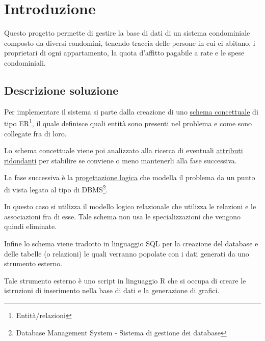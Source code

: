 \section{Introduzione}

Questo progetto permette di gestire la base di dati di
un sistema condominiale composto da diversi condomini,
tenendo traccia delle persone in cui ci abitano, i
proprietari di ogni appartamento, la quota d'affitto
pagabile a rate e le spese condominiali.

\subsection{Descrizione soluzione}

Per implementare il sistema si parte dalla creazione di uno
\hyperref[schemaER]{schema concettuale}
di tipo ER\footnote{Entità/relazioni},
il quale definisce quali entità sono presenti nel problema
e come sono collegate fra di loro.

Lo schema concettuale viene poi analizzato alla ricerca di
eventuali
\hyperref[ridondanze]{attributi ridondanti}
per stabilire se conviene o meno mantenerli alla fase successiva.

La fase successiva è la
\hyperref[logico]{progettazione logica}
che modella il problema da un punto di vista legato al tipo di
DBMS\footnote{Database Management System - Sistema di gestione dei database}.

In questo caso si utilizza il modello logico relazionale che
utilizza le relazioni e le associazioni fra di esse. Tale schema
non usa le specializzazioni che vengono quindi eliminate.


Infine lo schema viene tradotto in linguaggio SQL per la
creazione del database e delle tabelle (o relazioni) le quali
verranno popolate con i dati generati da uno strumento esterno.

Tale strumento esterno è uno script in linguaggio R che si
occupa di creare le istruzioni di inserimento nella base di dati
e la generazione di grafici.
